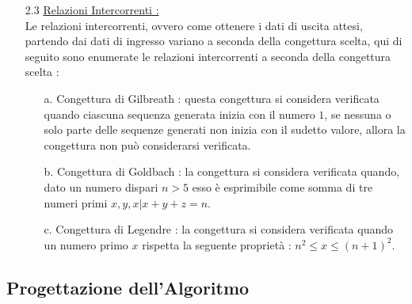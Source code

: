 \documentclass{article}
\begin{document}
\begin{enumerate}
\begin{enumerate}
     \end{enumerate}
    \Large\item[2.3] \underline{Relazioni Intercorrenti : }
    \large \\Le relazioni intercorrenti, ovvero come ottenere i dati di uscita attesi, partendo dai dati di ingresso variano a seconda della congettura scelta, qui di seguito sono enumerate le relazioni intercorrenti a seconda della congettura scelta : 
    \begin{enumerate}
        \item[a.] Congettura di Gilbreath : questa congettura si considera verificata quando ciascuna sequenza generata inizia con il numero \begin{math}1\end{math}, se nessuna o solo parte delle sequenze generati non inizia con il sudetto valore, allora la congettura non può considerarsi verificata.
       \item[b.] Congettura di Goldbach : la congettura si considera verificata quando, dato un numero dispari \begin{math}n > 5\end{math} esso è esprimibile come somma di tre numeri primi \begin{math} x, y, x | x + y + z = n\end{math}.
        \item[c.] Congettura di Legendre : la congettura si considera verificata quando un numero primo \begin{math} x \end{math} rispetta la seguente proprietà :  \begin{math}n^2 \leq x \leq (n + 1)^2\end{math}.
    \end{enumerate}
\end{enumerate}
\newpage
\begin{center}
    \section{Progettazione dell'Algoritmo}
\end{center}
\end{document}

